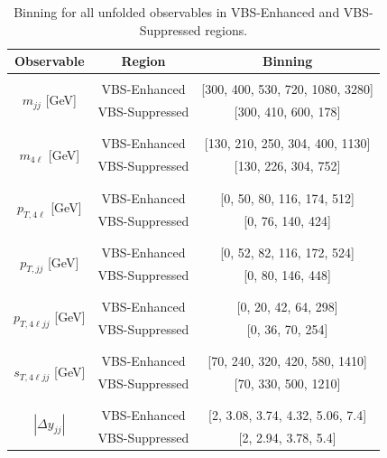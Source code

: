 \begin{table}[!htbp]
    \caption{Binning for all unfolded observables in VBS-Enhanced and VBS-Suppressed regions. \label{tab:binning}}
    \begin{center}
    \begin{tabular}{ | c | c | c | }
    \hline
    Observable & Region & Binning \\
    \hline \hline
    \multirow{4}{*}{ $m_{jj}$ [GeV] } &  &  \\
        & VBS-Enhanced & [300, 400, 530, 720, 1080, 3280] \\
    & VBS-Suppressed & [300, 410, 600, 178] \\
    & &\\
    \hline
    \multirow{4}{*}{ $m_{4\ell}$ [GeV] } &  &  \\
        & VBS-Enhanced & [130, 210, 250, 304, 400, 1130] \\
    & VBS-Suppressed & [130, 226, 304, 752] \\
    & &\\
    \hline
    \multirow{4}{*}{ $p_{T,4\ell}$ [GeV] } &  &  \\
    & VBS-Enhanced & [0, 50, 80, 116, 174, 512] \\
    & VBS-Suppressed & [0, 76, 140, 424]\\
    & &\\
    \hline
    \multirow{4}{*}{ $p_{T,jj}$ [GeV] } &  &  \\
    & VBS-Enhanced & [0, 52, 82, 116, 172, 524] \\
    & VBS-Suppressed & [0, 80, 146, 448]\\
    & &\\
    \hline
    \multirow{4}{*}{ $p_{T,4\ell jj}$ [GeV] } &  &  \\
    & VBS-Enhanced & [0, 20, 42, 64, 298] \\
    & VBS-Suppressed & [0, 36, 70, 254]\\
    & &\\
    \hline
    \multirow{4}{*}{ $s_{T,4\ell jj}$ [GeV] } &  &  \\
    & VBS-Enhanced & [70, 240, 320, 420, 580, 1410] \\
    & VBS-Suppressed & [70, 330, 500, 1210]\\
    & &\\
    \hline
    \multirow{4}{*}{ $|\Delta y_{jj}|$ } &  &  \\
    & VBS-Enhanced & [2, 3.08, 3.74, 4.32, 5.06, 7.4] \\
    & VBS-Suppressed & [2, 2.94, 3.78, 5.4]\\

\end{tabular}
\end{center}
\end{table}
